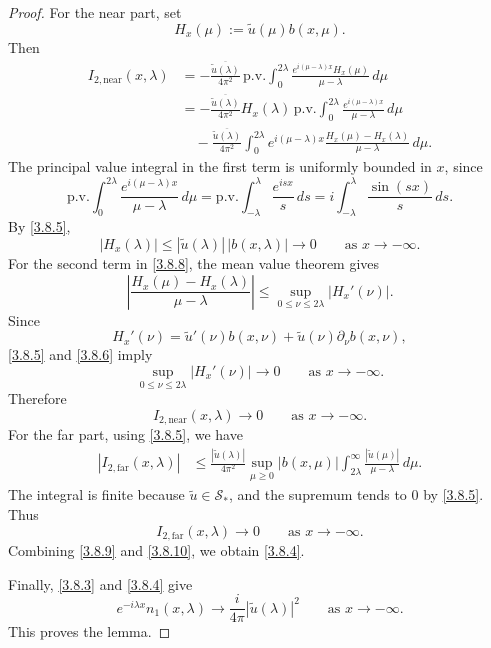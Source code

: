 \documentclass[10pt]{article}
\numberwithin{equation}{section}
\numberwithin{theorem}{section}
\begin{document}
\begin{proof}
For the near part, set
\[
H_x(\mu):=\widetilde u(\mu)b(x,\mu).
\]
Then
\begin{equation}
\label{3.8.8}
\begin{aligned}
I_{2,\mathrm{near}}(x,\lambda)
&=
-\frac{\overline{\widetilde u(\lambda)}}{4\pi^2}
\,\mathrm{p.v.}\int_0^{2\lambda}
\frac{e^{i(\mu-\lambda)x}H_x(\mu)}{\mu-\lambda}\,d\mu  \\
&=
-\frac{\overline{\widetilde u(\lambda)}}{4\pi^2}
H_x(\lambda)
\,\mathrm{p.v.}\int_0^{2\lambda}
\frac{e^{i(\mu-\lambda)x}}{\mu-\lambda}\,d\mu  \\
&\quad
-\frac{\overline{\widetilde u(\lambda)}}{4\pi^2}
\int_0^{2\lambda}
e^{i(\mu-\lambda)x}
\frac{H_x(\mu)-H_x(\lambda)}{\mu-\lambda}\,d\mu .
\end{aligned}
\end{equation}
The principal value integral in the first term is uniformly bounded in \(x\), since
\[
\mathrm{p.v.}\int_0^{2\lambda}
\frac{e^{i(\mu-\lambda)x}}{\mu-\lambda}\,d\mu
=
\mathrm{p.v.}\int_{-\lambda}^{\lambda}
\frac{e^{isx}}{s}\,ds
=
i\int_{-\lambda}^{\lambda}
\frac{\sin(sx)}{s}\,ds .
\]
By \eqref{3.8.5},
\[
|H_x(\lambda)|\le |\widetilde u(\lambda)|\,|b(x,\lambda)|\longrightarrow0 \qquad\text{as }x\to-\infty.
\]
For the second term in \eqref{3.8.8}, the mean value theorem gives
\[
\left|
\frac{H_x(\mu)-H_x(\lambda)}{\mu-\lambda}
\right|
\le
\sup_{0\le\nu\le2\lambda}|H_x'(\nu)|.
\]
Since
\[
H_x'(\nu)=\widetilde u'(\nu)b(x,\nu)+\widetilde u(\nu)\partial_\nu b(x,\nu),
\]
\eqref{3.8.5} and \eqref{3.8.6} imply
\[
\sup_{0\le\nu\le2\lambda}|H_x'(\nu)|\to0
\qquad\text{as }x\to-\infty .
\]
Therefore
\begin{equation}
\label{3.8.9}
I_{2,\mathrm{near}}(x,\lambda)\to0
\qquad\text{as }x\to-\infty .
\end{equation}
For the far part, using \eqref{3.8.5}, we have
\[
\begin{aligned}
|I_{2,\mathrm{far}}(x,\lambda)|
&\le
\frac{|\widetilde u(\lambda)|}{4\pi^2}
\sup_{\mu\ge0}|b(x,\mu)|
\int_{2\lambda}^{\infty}
\frac{|\widetilde u(\mu)|}{\mu-\lambda}\,d\mu .
\end{aligned}
\]
The integral is finite because \(\widetilde u\in\mathcal S_*\), and the supremum tends to
\(0\) by \eqref{3.8.5}. Thus
\begin{equation}
\label{3.8.10}
I_{2,\mathrm{far}}(x,\lambda)\to0
\qquad\text{as }x\to-\infty .
\end{equation}
Combining \eqref{3.8.9} and \eqref{3.8.10}, we obtain \eqref{3.8.4}.

Finally, \eqref{3.8.3} and \eqref{3.8.4} give
\[
e^{-i\lambda x}n_1(x,\lambda)
\longrightarrow
\frac{i}{4\pi}|\widetilde u(\lambda)|^2
\qquad\text{as }x\to-\infty .
\]
This proves the lemma.
\end{proof}
\end{document}

